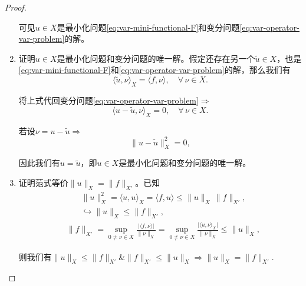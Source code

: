 \begin{proof}
\begin{enumerate}
可见$u \in X$是最小化问题\eqref{eq:var-mini-functional-F}和变分问题\eqref{eq:var-operator-var-problem}的解。

\item 证明$u \in X$是最小化问题和变分问题的唯一解。假定还存在另一个$\tilde{u} \in X$，也是\eqref{eq:var-mini-functional-F}和\eqref{eq:var-operator-var-problem}的解，那么我们有
\begin{equation*}
  \langle \widetilde{u}, \nu \rangle_{X} = \langle f, \nu \rangle, \quad \forall \, \nu \in X.
\end{equation*}

将上式代回变分问题\eqref{eq:var-operator-var-problem}$\Rightarrow$
\begin{equation*}
  \langle u - \widetilde{u}, \nu \rangle_{X} = 0, \quad \forall \, \nu \in X.
\end{equation*}

若设$\nu = u - \tilde{u} \Rightarrow $
\begin{equation*}
  \big\| u - \widetilde{u} \big\|_{X}^2 = 0,
\end{equation*}

因此我们有$u = \widetilde{u}$，即$u \in X$是最小化问题和变分问题的唯一解。

\item 证明范式等价$\big\| u \big\|_{X} = \big\| f \big\|_{X'}$。已知
\begin{equation*}
  \begin{split}
    &\big\| u \big\|_{X}^2 = \langle u,u \rangle_X = \langle  f, u \rangle \le \big\| u \big\|_{X} \, \big\| f \big\|_{X'}, \\
    &\hookrightarrow \big\| u \big\|_{X} \le \big\| f \big\|_{X'},
  \end{split}
\end{equation*}
\begin{equation*}
  \begin{split}
    &\big\| f \big\|_{X'} = \sup_{0 \neq \nu \in X} \frac{
    \big| \langle f, \nu \rangle \big|
    }{
    \big\| \nu \big\|_{X}
    }
    = \sup_{0 \neq \nu \in X}
    \frac{
    \big| \langle u, \nu \rangle _{X} \big|
    }{
    \big\| \nu \big\|_{X}
    }
    \le \big\| u \big\|_{X},
  \end{split}
\end{equation*}

则我们有$\big\| u \big\|_{X} \le  \big\| f \big\|_{X'} \& \big\| f \big\|_{X'} \le \big\| u \big\|_{X} \Rightarrow \big\| u \big\|_{X} =  \big\| f \big\|_{X'}.$
\end{enumerate}
\end{proof}

